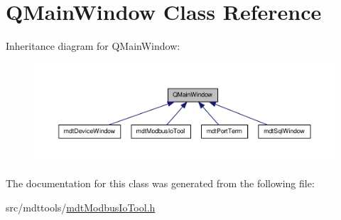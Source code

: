 \hypertarget{class_q_main_window}{\section{Q\-Main\-Window Class Reference}
\label{class_q_main_window}
}


Inheritance diagram for Q\-Main\-Window\-:\nopagebreak
\begin{figure}[H]
\begin{center}
\leavevmode
\includegraphics[width=350pt]{class_q_main_window__inherit__graph}
\end{center}
\end{figure}


The documentation for this class was generated from the following file\-:\begin{DoxyCompactItemize}
\item 
src/mdttools/\hyperlink{mdt_modbus_io_tool_8h}{mdt\-Modbus\-Io\-Tool.\-h}\end{DoxyCompactItemize}
